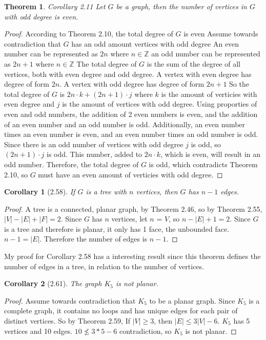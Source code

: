 \documentclass{article}
\newtheorem*{thm}{Theorem}
\newtheorem*{cor}{Corollary}
\begin{document}
\begin{description}
		\begin{thm}Corollary 2.11     Let $G$ be a graph, then the number of vertices in $G$ with odd degree is even. \end{thm}
 		\begin{proof}    According to Theorem 2.10,  the total degree of $G$ is even 
 			Assume towards contradiction that $G$ has an odd amount vertices with odd degree
  			An even number can be represented as $2n$ where $n \in \mathbb{Z}$ an odd number can be represented as $2n + 1$ where 
			$n \in \mathbb{Z}$
			The total degree of $G$ is the sum of the degree of all vertices, both with even degree and odd degree.
			A vertex with even degree has degree of form $2n$. A vertex with odd degree has degree of form $2n + 1$  
  			So the total degree of $G$ is $2n\cdot k + (2n+1)\cdot j$ where $k$ is the amount of verticies with even degree and $j$
			is the amount of vertices with odd degree.
  			Using proporties of even and odd numbers, the addition of 2 even numbers is even, and the addition of an even number 
			and an odd number is odd. Additionally, an even number times an even number is even, 
			and an even number times an odd number is odd.
			Since there is an odd number of vertices with odd degree $j$ is odd, so $(2n+1)\cdot j$ is odd. 
			This number, added to $2n\cdot k$, which is even, will result in an odd number. Therefore, the 
			total degree of $G$ is odd, which contradicts Theorem 2.10, so $G$ must have an even amount of verticies with odd degree.
  		\end{proof}

\begin{cor}[2.58]
	    	If $G$ is a tree with $n$ vertices, then $G$ has $n - 1$ edges.
		      \end{cor}
		\begin{proof}
			A tree is a connected, planar graph, by Theorem 2.46, so by Theorem 2.55, $|V| - |E| + |F| = 2$. Since $G$ has $n$ vertices, 
			let $n$ = $V$, so
			$n - |E| + 1 = 2$. Since $G$ is a tree and therefore is planar, it only has 1 face, the unbounded face. $n - 1 = |E|$. Therefore the number of edges is $n - 1$.
		\end{proof}
		
		My proof for Corollary 2.58 has a interesting result since this theorem defines the number of edges in a tree, in relation to the number
		of vertices. 
	
		\begin{cor}[2.61]
		  	The graph $K_5$ is not planar.
		\end{cor}
		\begin{proof}
			Assume towards contradiction that $K_5$ to be a planar graph. Since $K_5$ is a complete graph, it contains no loops and 
			has unique edges for each pair of distinct vertices. So by Theorem 2.59, If $|V| \geq 3$, then $|E| \leq 3|V| - 6.$
			$K_5$ has 5 vertices and 10 edges. $10 \nleq 3*5 - 6$ contradiction, so $K_5$ is not planar. 
		\end{proof}
	

\end{description}
\end{document}
